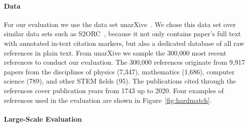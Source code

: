 \paragraph{Data}
For our evaluation we use the data set unarXive~\cite{Saier2020}. We chose this data set over similar data sets such as S2ORC~\cite{Lo2020}, because it not only contains paper's full text with annotated in-text citation markers, but also a dedicated database of all raw references in plain text. From unarXive we sample the 300,000 most recent references to conduct our evaluation. The 300,000 references originate from 9,917 papers from the disciplines of physics (7,347), mathematics (1,686), computer science (789), and other STEM fields (95). The publications cited through the references cover publication years from 1743 up to 2020. Four examples of references used in the evaluation are shown in Figure~\ref{fig:hardmatch}.




\paragraph{Large-Scale Evaluation}




